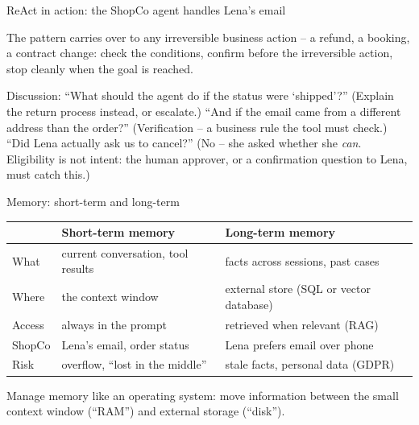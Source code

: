 \documentclass[aspectratio=169,11pt]{beamer}
\gdef\aidasourcetext{}%
\gdef\aidasourcetext{}
\newcommand{\source}[1]{\gdef\aidasourcetext{Source: #1}}
\begin{document}
\begin{frame}{ReAct in action: the ShopCo agent handles Lena's email}
{  The pattern carries over to any irreversible business action -- a refund, a booking, a contract change: check the conditions, confirm before the irreversible action, stop cleanly when the goal is reached.\par
  Discussion: ``What should the agent do if the status were `shipped'?'' (Explain the return process instead, or escalate.) ``And if the email came from a different address than the order?'' (Verification -- a business rule the tool must check.) ``Did Lena actually ask us to cancel?'' (No -- she asked whether she \emph{can}. Eligibility is not intent: the human approver, or a confirmation question to Lena, must catch this.)}
\end{frame}

\begin{frame}{Memory: short-term and long-term}
  \small
  \renewcommand{\arraystretch}{1.3}
  \begin{tabularx}{\linewidth}{@{}L{2.6cm} Y Y@{}}
    \toprule
     & \textbf{\color{cBlue}Short-term memory} & \textbf{\color{cPurple}Long-term memory}\\
    \midrule
    What & current conversation, tool results & facts across sessions, past cases\\
    Where & the context window & external store (SQL or vector database)\\
    Access & always in the prompt & retrieved when relevant (RAG)\\
    ShopCo & Lena's email, order status & Lena prefers email over phone\\
    Risk & overflow, ``lost in the middle'' & stale facts, personal data (GDPR)\\
    \bottomrule
  \end{tabularx}
  \par\vspace{6pt}
  \begin{infobox}
    Manage memory like an operating system: move information between the small context window (``RAM'') and external storage (``disk'').
  \end{infobox}
  \source{Packer et al. (2023)}
\end{frame}
\end{document}
